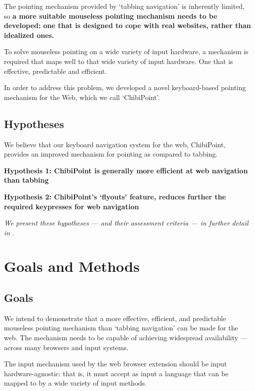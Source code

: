 \documentclass[11pt,openright,a4paper]{report}
\begin{document}
The pointing mechanism provided by `tabbing navigation' is inherently limited, so \textbf{a more suitable mouseless pointing mechanism needs to be developed: one that is designed to cope with real websites, rather than idealized ones.}

To solve mouseless pointing on a wide variety of input hardware, a mechanism is required that maps well to that wide variety of input hardware. One that is effective, predictable and efficient.

In order to address this problem, we developed a novel keyboard-based pointing mechanism for the Web, which we call `ChibiPoint'.

\subsection{Hypotheses}
\label{chap:hypotheses}
We believe that our keyboard navigation system for the web, ChibiPoint, provides an improved mechanism for pointing as compared to tabbing.

\newcommand{\hypone}{Hypothesis 1: ChibiPoint is generally more efficient at web navigation than tabbing}
\textbf{\hypone}

\newcommand{\hyptwo}{Hypothesis 2: ChibiPoint's `flyouts' feature, reduces further the required keypresses for web navigation}
\textbf{\hyptwo}

\textit{We present these hypotheses --- and their assessment criteria --- in further detail in }.
\section{Goals and Methods}
\subsection{Goals}
\label{sec:goals}
We intend to demonstrate that a more effective, efficient, and predictable mouseless pointing mechanism than `tabbing navigation' can be made for the web. The mechanism needs to be capable of achieving widespread availability --- across many browsers and input systems.

The input mechanism used by the web browser extension should be input hardware-agnostic: that is, it must accept as input a language that can be mapped to by a wide variety of input methods.
\end{document}
